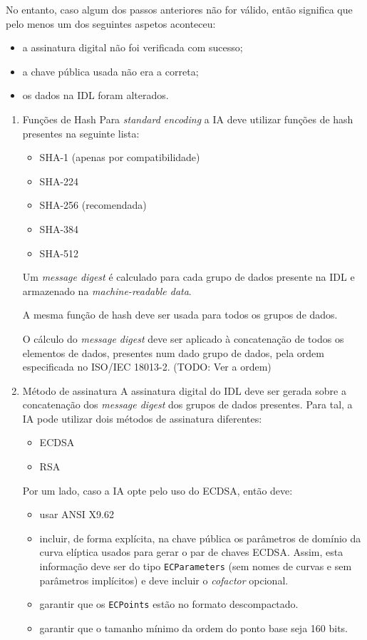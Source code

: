 No entanto, caso algum dos passos anteriores não for válido, então significa
que pelo menos um dos seguintes aspetos aconteceu:
\begin{itemize}
\item a assinatura digital não foi verificada com sucesso;
\item a chave pública usada não era a correta;
\item os dados na IDL foram alterados.
\end{itemize}

\begin{enumerate}
\item Funções de Hash
\label{sec:org2a0f02b}
Para \emph{standard encoding} a IA deve utilizar funções de hash presentes na
seguinte lista:
\begin{itemize}
\item SHA-1 (apenas por compatibilidade)
\item SHA-224
\item SHA-256 (recomendada)
\item SHA-384
\item SHA-512
\end{itemize}

Um \emph{message digest} é calculado para cada grupo de dados presente na IDL e
armazenado na \emph{machine-readable data}.

A mesma função de hash deve ser usada para todos os grupos de dados.

O cálculo do \emph{message digest} deve ser aplicado à concatenação de todos os
elementos de dados, presentes num dado grupo de dados, pela ordem
especificada no ISO/IEC 18013-2. (TODO: Ver a ordem)

\item Método de assinatura
\label{sec:org4555f78}
A assinatura digital do IDL deve ser gerada sobre a concatenação dos
\emph{message digest} dos grupos de dados presentes. Para tal, a IA pode utilizar
dois métodos de assinatura diferentes:
\begin{itemize}
\item ECDSA
\item RSA
\end{itemize}

Por um lado, caso a IA opte pelo uso do ECDSA, então deve:
\begin{itemize}
\item usar ANSI X9.62
\item incluir, de forma explícita, na chave pública os parâmetros de domínio da
curva elíptica usados para gerar o par de chaves ECDSA. Assim, esta
informação deve ser do tipo \texttt{ECParameters} (sem nomes de curvas e sem
parâmetros implícitos) e deve incluir o \emph{cofactor} opcional.
\item garantir que os \texttt{ECPoints} estão no formato descompactado.
\item garantir que o tamanho mínimo da ordem do ponto base seja 160 bits.
\end{itemize}


\end{enumerate}
